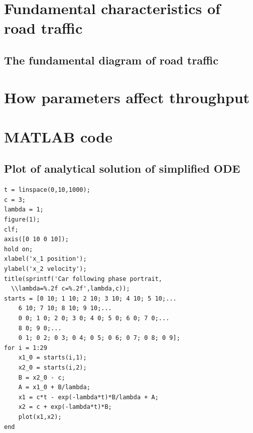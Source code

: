 \documentclass[11pt,a4paper]{article}
\begin{document}
\section{Fundamental characteristics of road traffic}
\subsection{The fundamental diagram of road traffic}


\section{How parameters affect throughput}

\section{MATLAB code}
\subsection{Plot of analytical solution of simplified ODE}
\begin{verbatim}
t = linspace(0,10,1000);
c = 3;
lambda = 1;
figure(1);
clf;
axis([0 10 0 10]);
hold on;
xlabel('x_1 position');
ylabel('x_2 velocity');
title(sprintf('Car following phase portrait,
  \\lambda=%.2f c=%.2f',lambda,c));
starts = [0 10; 1 10; 2 10; 3 10; 4 10; 5 10;...
    6 10; 7 10; 8 10; 9 10;...
    0 0; 1 0; 2 0; 3 0; 4 0; 5 0; 6 0; 7 0;...
    8 0; 9 0;...
    0 1; 0 2; 0 3; 0 4; 0 5; 0 6; 0 7; 0 8; 0 9];
for i = 1:29
    x1_0 = starts(i,1);
    x2_0 = starts(i,2);
    B = x2_0 - c;
    A = x1_0 + B/lambda;
    x1 = c*t - exp(-lambda*t)*B/lambda + A;
    x2 = c + exp(-lambda*t)*B;
    plot(x1,x2);
end

\end{verbatim}
\end{document}
